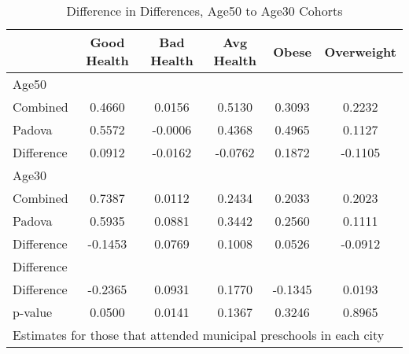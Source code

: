 \begin{table}[htbp]\centering
\caption{Difference in Differences, Age50 to Age30 Cohorts}
\begin{tabular}{l*{5}{c}}
\hline\hline
            & Good Health&  Bad Health&  Avg Health&       Obese&  Overweight\\
\hline
Age50       &            &            &            &            &            \\
Combined    &      0.4660&      0.0156&      0.5130&      0.3093&      0.2232\\
Padova      &      0.5572&     -0.0006&      0.4368&      0.4965&      0.1127\\
Difference  &      0.0912&     -0.0162&     -0.0762&      0.1872&     -0.1105\\
\hline
Age30       &            &            &            &            &            \\
Combined    &      0.7387&      0.0112&      0.2434&      0.2033&      0.2023\\
Padova      &      0.5935&      0.0881&      0.3442&      0.2560&      0.1111\\
Difference  &     -0.1453&      0.0769&      0.1008&      0.0526&     -0.0912\\
\hline
Difference  &            &            &            &            &            \\
Difference  &     -0.2365&      0.0931&      0.1770&     -0.1345&      0.0193\\
p-value     &      0.0500&      0.0141&      0.1367&      0.3246&      0.8965\\
\hline\hline
\multicolumn{6}{l}{\footnotesize Estimates for those that attended municipal preschools in each city}\\
\end{tabular}
\end{table}
